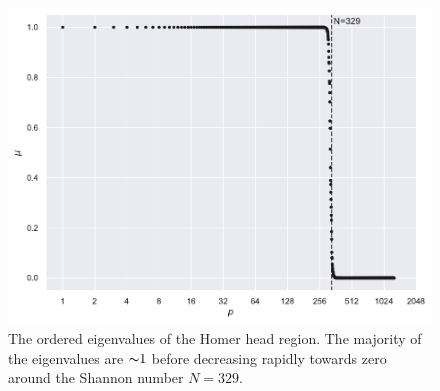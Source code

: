 \begin{figure}[htpb]
	\centering\capstart{}
	\includegraphics[width=\textwidth]{homer_slepian_eigenvalues_b1275.pdf}
	\caption[
		The Slepian eigenvalues of the Homer head region
	]{
		The ordered eigenvalues of the Homer head region.
		The majority of the eigenvalues are \({\thicksim}1\) before decreasing rapidly towards zero around the Shannon number \(N=329\).
	}\label{fig:chapter5_slepian_eigenvalues}
\end{figure}
